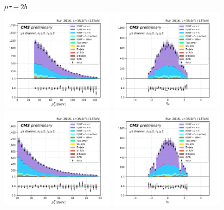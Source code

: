 \begin{figure}[ht]
    \centering
    $\mu\tau - 2b$ \\
    \includegraphics[width=0.49\textwidth]{chapters/Appendix/sectionPlots/figures/kinematics_pickles/mutau/2b/mutau_2b_lepton1_pt.pdf}
    \includegraphics[width=0.49\textwidth]{chapters/Appendix/sectionPlots/figures/kinematics_pickles/mutau/2b/mutau_2b_lepton1_eta.pdf}
    \includegraphics[width=0.49\textwidth]{chapters/Appendix/sectionPlots/figures/kinematics_pickles/mutau/2b/mutau_2b_lepton2_pt.pdf}
    \includegraphics[width=0.49\textwidth]{chapters/Appendix/sectionPlots/figures/kinematics_pickles/mutau/2b/mutau_2b_lepton2_eta.pdf}

\end{figure}
